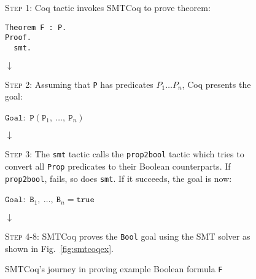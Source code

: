 \documentclass[11pt]{article}
\begin{document}
	\begin{figure}[t]
		\begin{framed}
			\textsc{Step 1}: Coq tactic invokes SMTCoq
			to prove theorem:
			\begin{verbatim}
Theorem F : P.
Proof.
  smt.
			\end{verbatim}
		\end{framed}
		\vspace{-0.3in}
		\begin{center}
			$\downarrow$
		\end{center}
		\vspace{-0.3in}
		\begin{framed}
			\textsc{Step 2}: Assuming that \texttt{P}
			has predicates $P_1 \ldots P_n$, Coq
			presents the goal:
			\begin{center}
				$\texttt{Goal}:$ $\texttt{P}(\texttt{P}_1,\  
				\ldots,\ \texttt{P}_n)$
			\end{center}
		\end{framed}
		\vspace{-0.3in}
		\begin{center}
			$\downarrow$
		\end{center}
		\vspace{-0.3in}
		\begin{framed}
			\textsc{Step 3}: The \texttt{smt} tactic
			calls the \texttt{prop2bool} tactic 
			which tries to convert all \texttt{Prop}
			predicates to their Boolean counterparts.
			If \texttt{prop2bool}, fails, so does
			\texttt{smt}. If it succeeds, the goal 
			is now:
			\begin{center}
				$\texttt{Goal}:$ $\texttt{B}_1,\ \ldots,\  \texttt{B}_n 
				= \texttt{true}$
			\end{center}
		\end{framed}
		\vspace{-0.3in}
		\begin{center}
			$\downarrow$
		\end{center}
		\vspace{-0.3in}
		\begin{framed}
			\textsc{Step 4-8}: SMTCoq proves the \texttt{Bool}
			goal using the SMT solver as 
			shown in Fig.~\ref{fig:smtcoqex}.
		\end{framed}
		\caption{SMTCoq's journey in proving 
			example Boolean formula \texttt{F}}
		\label{fig:prop2bool}
	\end{figure}
	
\end{document}
